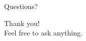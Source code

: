 \documentclass[13pt]{beamer}
\begin{document}
%
\begin{frame}{Questions?}
	\begin{block}{}
		Thank you!\\
            \vspace{5mm}
        Feel free to ask anything.
	\end{block}
\end{frame}
\end{document}
